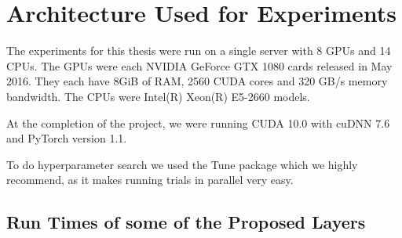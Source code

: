 \chapter{Architecture Used for Experiments} \label{app:arch}
\def \path {dtcwt_scat}
\def \imgpath {\path/images}

The experiments for this thesis were run on a single server with 8 GPUs and 14
CPUs. The GPUs were each NVIDIA GeForce GTX 1080 cards released in May 2016.
They each have 8GiB of RAM, 2560 CUDA cores and 320 GB/s memory bandwidth.
The CPUs were Intel(R) Xeon(R) E5-2660 models. 

At the completion of the project, we were running CUDA 10.0 with cuDNN 7.6 and 
PyTorch version 1.1.

To do hyperparameter search we used the Tune package \cite{liaw2018tune} which
we highly recommend, as it makes running trials in parallel very easy.

\section{Run Times of some of the Proposed Layers}

